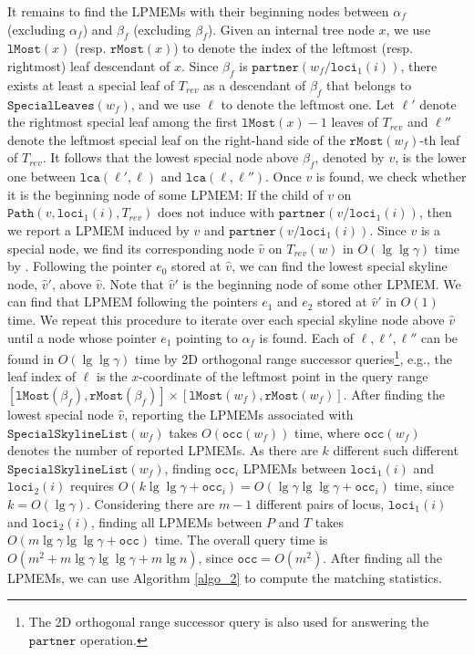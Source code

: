 \documentclass[smallabstract,smallcaptions]{dccpaper}
\def\idtt#1{\ensuremath{\mathtt{#1}}}
\def\occ{\idtt{occ}}
\def\partner{\idtt{partner}}
\def\path{\idtt{Path}}
\def\loci{\idtt{loci}}
\def\SpecialLeaves{\idtt{SpecialLeaves}}
\def\SpecialSkylineList{\idtt{SpecialSkylineList}}
\def\lMost{\idtt{lMost}}
\def\rMost{\idtt{rMost}}
\def\lca{\idtt{lca}}
\begin{document}
It remains to find the LPMEMs with their beginning nodes between $\alpha_f$ (excluding $\alpha_f$) and $\beta_f$ (excluding $\beta_f$).
Given an internal tree node $x$, we use $\lMost(x)$ (resp. $\rMost(x)$) to denote the index of the leftmost (resp. rightmost) leaf descendant of $x$.
Since $\beta_f$ is $\partner(w_f/\loci_1(i))$, there exists at least a special leaf of $T_{rev}$ as a descendant of $\beta_f$ that belongs to $\SpecialLeaves(w_f)$, and we use $\ell$ to denote the leftmost one.
Let $\ell'$ denote the rightmost special leaf among the first $\lMost(x)-1$ leaves of $T_{rev}$ and $\ell''$ denote the leftmost special leaf on the right-hand side of the $\rMost(w_f)$-th leaf of $T_{rev}$.
It follows that the lowest special node above $\beta_f$, denoted by $v$, is the lower one between $\lca(\ell', \ell)$ and $\lca(\ell, \ell'')$.
Once $v$ is found, we check whether it is the beginning node of some LPMEM: If the child of $v$ on $\path(v, \loci_1(i), T_{rev})$ does not induce with $\partner(v/\loci_1(i))$, then we report a LPMEM induced by $v$ and $\partner(v/\loci_1(i))$.
Since $v$ is a special node, we find its corresponding node $\hat{v}$ on $T_{rev}(w)$ in $O(\lg \lg \gamma)$ time by \cite[Lemma 19]{abedin2018heaviest}.
Following the pointer $e_0$ stored at $\hat{v}$, we can find the lowest special skyline node, $\hat{v}'$, above $\hat{v}$.
Note that $\hat{v}'$ is the beginning node of some other LPMEM.
We can find that LPMEM following the pointers $e_1$ and $e_2$ stored at $\hat{v}'$ in $O(1)$ time.
We repeat this procedure to iterate over each special skyline node above $\hat{v}$ until  a node whose pointer $e_1$ pointing to $\alpha_f$ is found.
Each of $\ell, \ell', \ell''$ can be found in $O(\lg \lg \gamma)$ time by 2D orthogonal range successor queries\footnote{The 2D orthogonal range successor query is also used for answering the $\partner$ operation.}, e.g., the leaf index of $\ell$ is the $x$-coordinate of the leftmost point in the query range $[\lMost(\beta_f), \rMost(\beta_f)]\times[\lMost(w_f), \rMost(w_f)]$.
After finding the lowest special node $\hat{v}$, reporting the LPMEMs associated with $\SpecialSkylineList(w_f)$ takes $O(\occ(w_f))$ time, where $\occ(w_f)$ denotes the number of reported LPMEMs.
As there are $k$ different such different $\SpecialSkylineList(w_f)$, finding $\occ_i$ LPMEMs between $\loci_1(i)$ and $\loci_2(i)$ requires $O(k\lg \lg \gamma+\occ_i)=O(\lg \gamma \lg \lg \gamma + \occ_i)$ time, since $k=O(\lg \gamma)$.
Considering there are $m-1$ different pairs of locus, $\loci_1(i)$ and $\loci_2(i)$, finding all LPMEMs between $P$ and $T$ takes $O(m\lg \gamma \lg \lg \gamma + \occ)$ time.
The overall query time is $O(m^2+m\lg \gamma \lg \lg \gamma +m\lg n)$, since $\occ=O(m^2)$.
After finding all the LPMEMs, we can use Algorithm \ref{algo_2} to compute the matching statistics.
\end{document}
